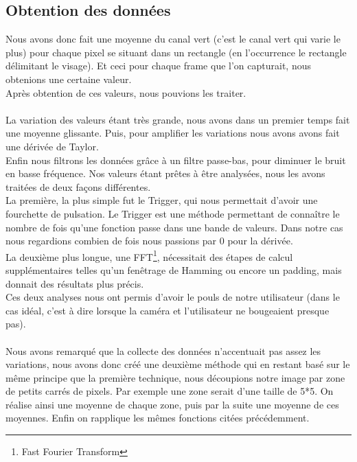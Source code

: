  \subsection{Obtention des données}
 Nous avons donc fait une moyenne du canal vert (c'est le canal vert qui varie le plus) pour chaque pixel se situant dans un rectangle (en l’occurrence le rectangle délimitant le visage).
 Et ceci pour chaque frame que l'on capturait, nous obtenions une certaine valeur.\\
 Après obtention de ces valeurs, nous pouvions les traiter.\\\\
 La variation des valeurs étant très grande, nous avons dans un premier temps fait une moyenne glissante. Puis, pour amplifier les variations nous avons avons fait une dérivée de Taylor. \\Enfin nous filtrons les données grâce à un filtre passe-bas, pour diminuer le bruit en basse fréquence.
 Nos valeurs étant prêtes à être analysées, nous les avons traitées de deux façons différentes.\\
 La première, la plus simple fut le Trigger, qui nous permettait d'avoir une fourchette de pulsation.
 Le Trigger est une méthode permettant de connaître le nombre de fois qu'une fonction passe dans une bande de valeurs. Dans notre cas nous regardions combien de fois nous passions par 0 pour la dérivée.
 \\ La deuxième plus longue, une FFT\footnote{Fast Fourier Transform}, nécessitait des étapes de calcul supplémentaires telles qu'un fenêtrage de Hamming ou encore un padding, mais donnait des résultats plus précis.
 \\
 Ces deux analyses nous ont permis d'avoir le pouls de notre utilisateur (dans le cas idéal, c'est à dire lorsque la caméra et l'utilisateur ne bougeaient presque pas).
 \\\\

Nous avons remarqué que la collecte des données n'accentuait pas assez les variations, nous avons donc créé une deuxième méthode qui en restant basé sur le même principe que la première technique, nous découpions notre image
par zone de petits carrés de pixels. Par exemple une zone serait d'une taille de 5*5. On réalise ainsi une moyenne de chaque zone, puis par la suite une moyenne de ces moyennes. Enfin on rapplique les mêmes fonctions citées précédemment.

